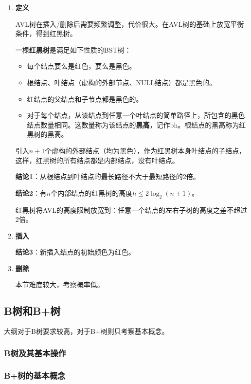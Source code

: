 \documentclass[12pt, a4paper, oneside]{ctexart}
\begin{document}
\begin{enumerate}
  \item {\bf 定义}
  
  AVL树在插入/删除后需要频繁调整，代价很大。在AVL树的基础上放宽平衡条件，得到红黑树。

  一棵\textbf{红黑树}是满足如下性质的BST树：
  \begin{itemize}
    \item 每个结点要么是红色，要么是黑色。
    \item 根结点、叶结点（虚构的外部节点、NULL结点）都是黑色的。
    \item 红结点的父结点和子节点都是黑色的。
    \item 对于每个结点，从该结点到任意一个叶结点的简单路径上，所包含的黑色结点数量相同。这数量称为该结点的\textbf{黑高}，记作bh。根结点的黑高称为红黑树的黑高。
  \end{itemize}

  引入$n+1$个虚构的外部结点（均为黑色），作为红黑树本身叶结点的子结点，这样，红黑树的所有结点都是内部结点，没有叶结点。

  \textbf{结论1}：从根结点到叶结点的最长路径不大于最短路径的2倍。

  \textbf{结论2}：有$n$个内部结点的红黑树的高度$h\leq 2\log_2 (n+1)$。

  红黑树将AVL的高度限制放宽到：任意一个结点的左右子树的高度之差不超过2倍。

  \item {\bf 插入}
  
  \textbf{结论3}：新插入结点的初始颜色为红色。

  

  \item {\bf 删除}
  
  本节难度较大，考察概率低。
\end{enumerate}

\subsection{B树和B+树}

大纲对于B树要求较高，对于B+树则只考察基本概念。

\subsubsection{B树及其基本操作}

\subsubsection{B+树的基本概念}
\end{document}
